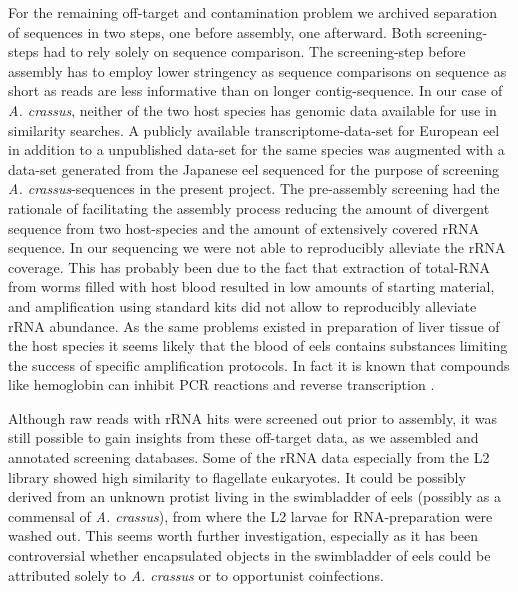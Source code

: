 \documentclass[10pt]{bmc_article}
\newenvironment{bmcformat}{\begin{raggedright}\baselineskip20pt\sloppy\setboolean{publ}{false}}{\end{raggedright}\baselineskip20pt\sloppy}
\begin{document}
\begin{bmcformat}
For the remaining off-target and contamination problem we archived
separation of sequences in two steps, one before assembly, one
afterward. Both screening-steps had to rely solely on sequence
comparison. The screening-step before assembly has to employ lower
stringency as sequence comparisons on sequence as short as reads are
less informative than on longer contig-sequence. In our case of
\textit{A. crassus}, neither of the two host species has genomic data
available for use in similarity searches. A publicly available
transcriptome-data-set for European eel \cite{pmid21080939} in addition
to a unpublished data-set for the same species was augmented with a
data-set generated from the Japanese eel sequenced for the purpose of
screening \textit{A. crassus}-sequences in the present project. The
pre-assembly screening had the rationale of facilitating the assembly
process reducing the amount of divergent sequence from two
host-species and the amount of extensively covered rRNA sequence. In
our sequencing we were not able to reproducibly alleviate the rRNA
coverage. This has probably been due to the fact that extraction of
total-RNA from worms filled with host blood resulted in low amounts of
starting material, and amplification using standard kits did not allow
to reproducibly alleviate rRNA abundance. As the same problems
existed in preparation of liver tissue of the host species it seems
likely that the blood of eels contains substances limiting the success
of specific amplification protocols. In fact it is known that
compounds like hemoglobin can inhibit PCR reactions \cite{pmid9327537}
and reverse transcription \cite{pmid16109794}.

Although raw reads with rRNA hits were screened out prior to assembly,
it was still possible to gain insights from these off-target data, as
we assembled and annotated screening databases. Some of the rRNA data
especially from the L2 library showed high similarity to flagellate
eukaryotes. It could be possibly derived from an unknown protist
living in the swimbladder of eels (possibly as a commensal of
\textit{A. crassus}), from where the L2 larvae for RNA-preparation were
washed out. This seems worth further investigation, especially as it
has been controversial whether encapsulated objects in the swimbladder
of eels could be attributed solely to \textit{A. crassus}
\cite{heitlinger_massive_2009} or to opportunist coinfections. 


\end{bmcformat}
\end{document}
